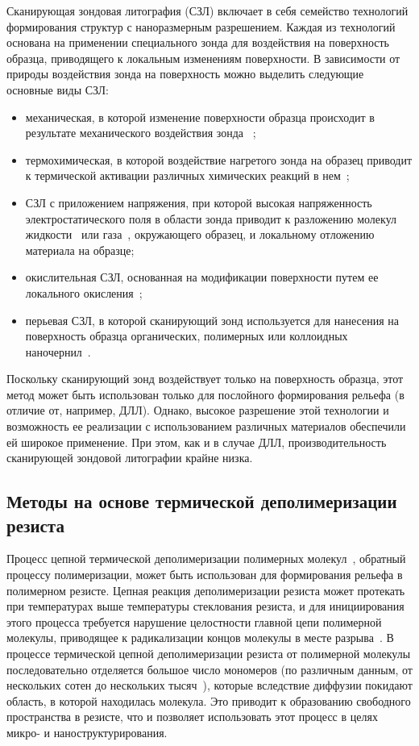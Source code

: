 Сканирующая зондовая литография (СЗЛ) включает в себя семейство технологий формирования структур с наноразмерным разрешением. Каждая из технологий основана на применении специального зонда для воздействия на поверхность образца, приводящего к локальным изменениям поверхности. В зависимости от природы воздействия зонда на поверхность можно выделить следующие основные виды СЗЛ:
\begin{itemize}
	\item механическая, в которой изменение поверхности образца происходит в результате механического воздействия зонда ~\cite{SPL_mechanical};
	\item  термохимическая, в которой воздействие нагретого зонда на образец приводит к термической активации различных химических реакций в нем~\cite{SPL_termochemical};
	\item СЗЛ с приложением напряжения, при которой высокая напряженность электростатического поля в области зонда приводит к разложению молекул жидкости~\cite{SPL_bias_liquid} или газа~\cite{SPL_bias_gas}, окружающего образец, и локальному отложению материала на образце;
	\item окислительная СЗЛ, основанная на модификации поверхности путем ее локального окисления~\cite{SPL_oxidation};
	\item перьевая СЗЛ, в которой сканирующий зонд используется для нанесения на поверхность образца органических, полимерных или коллоидных наночернил~\cite{SPL_dip_pen_1, SPL_dip_pen_2}.
\end{itemize}

Поскольку сканирующий зонд воздействует только на поверхность образца, этот метод может быть использован только для послойного формирования рельефа (в отличие от, например, ДЛЛ). Однако, высокое разрешение этой технологии и возможность ее реализации с использованием различных материалов обеспечили ей широкое применение. При этом, как и в случае ДЛЛ, производительность сканирующей зондовой литографии крайне низка.


\subsection{Методы на основе термической деполимеризации резиста}

Процесс цепной термической деполимеризации полимерных молекул~\cite{depol_general_1}, обратный процессу полимеризации, может быть использован для формирования рельефа в полимерном резисте. Цепная реакция деполимеризации резиста может протекать при температурах выше температуры стеклования резиста, и для инициирования этого процесса требуется нарушение целостности главной цепи полимерной молекулы, приводящее к радикализации концов молекулы в месте разрыва~\cite{depol_general_2}. В процессе термической цепной деполимеризации резиста от полимерной молекулы последовательно отделяется большое число мономеров (по различным данным, от нескольких сотен до нескольких тысяч~\cite{Cowley_1952_1, Mita_PMMA_zip_lengths_T, Inaba_zip_len}), которые вследствие диффузии покидают область, в которой находилась молекула. Это приводит к образованию свободного пространства в резисте, что и позволяет использовать этот процесс в целях микро- и наноструктурирования.

